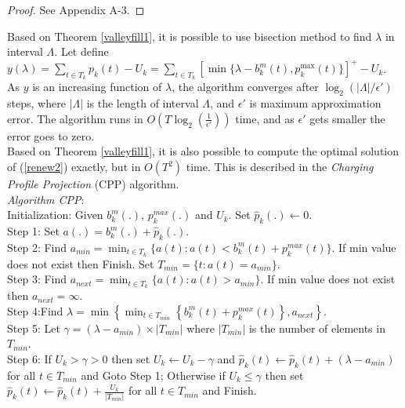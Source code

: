 \documentclass[12pt,draftcls,onecolumn]{IEEEtran}
\begin{document}
\begin{proof}
See Appendix A-3.
\end{proof}
\indent Based on Theorem \ref{valleyfill1}, it is possible to use bisection method to find $\lambda$ in interval $\Lambda$. Let define $y(\lambda)=\sum_{t \in T_k}p_k(t)-U_k=\sum_{t \in T_k}[\min\{\lambda-b_k^m(t), p_k^{\max}(t)\}]^+ - U_k$. As $y$ is an increasing function of $\lambda$, the algorithm converges after $\log_2(|\Lambda|/{\epsilon'})$ steps, where $|\Lambda|$ is the length of interval $\Lambda$, and $\epsilon'$ is maximum approximation error. The algorithm runs in $O(T\log_2(\frac{1}{\epsilon'}))$ time, and as $\epsilon'$ gets smaller the error goes to zero.\\
\indent Based on Theorem \ref{valleyfill1}, it is also possible to compute the optimal solution of (\ref{renew2}) exactly, but in $O(T^2)$ time. This is described in the \emph{Charging Profile Projection} (CPP) algorithm.\\
\noindent \textit{Algorithm CPP}: \\
\indent Initialization: Given $b_k^m(.)$, $p_k^{max}(.)$ and $U_k$. Set $\hat{p}_k(.) \leftarrow 0$.\\
\indent Step 1: Set $a(.) = b_k^m(.)+\hat{p}_k(.)$.\\
\indent Step 2: Find $a_{min} = \min_{t\in T_k}\{a(t): a(t) < b_k^m(t)+p_k^{max}(t)\}$. If min value does not exist then Finish. Set $T_{min}=\{t: a(t)=a_{min}\}$.\\
\indent Step 3: Find $a_{next}=\min_{t \in T_k}\{a(t): a(t) > a_{min}\}$. If min value does not exist then $a_{next}=\infty$.\\
Step 4:Find $\lambda = \min\left\{\min_{t\in T_{min}}\left\{b_k^m(t)+p_k^{max}(t)\right\}, a_{next}\right\}$.\\
\indent Step 5: Let $\gamma = (\lambda - a_{min}) \times |T_{min}|$ where $|T_{min}|$ is the number of elements in $T_{min}$.\\
\indent Step 6: If $U_k > \gamma > 0$ then set $U_k \leftarrow U_k - \gamma$ and $\hat{p}_k(t)\leftarrow \hat{p}_k(t) + (\lambda - a_{min})$ for all $t \in T_{min}$ and Goto Step 1; Otherwise if $U_k \leq \gamma$ then set $\hat{p}_k(t) \leftarrow \hat{p}_k(t)+\frac{U_k}{|T_{min}|}$ for all $t \in T_{min}$ and Finish.\\
\end{document}

